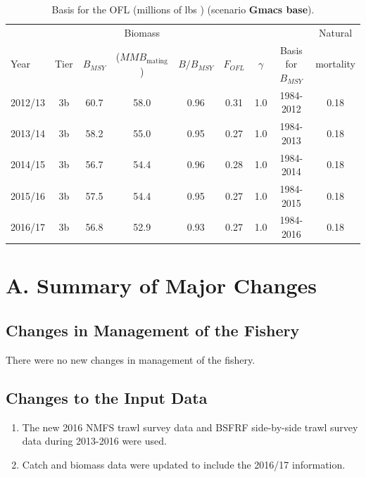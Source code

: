 \documentclass[]{article}
\providecommand{\tightlist}{%
  \setlength{\itemsep}{0pt}\setlength{\parskip}{0pt}}
\begin{document}
\begin{table}[ht]
\centering
\caption{Basis for the OFL (millions of lbs ) (scenario {\bf Gmacs base}).} 
\label{tab:ofl_basis_pounds}
\begin{tabular}{lcccccccc}
\hline
     &      &                  & Biomass                        &                    &                  &          &                            & Natural  \\ 
Year & Tier & $B_\mathit{MSY}$ & ($\mathit{MMB}_\text{mating}$) & $B/B_\mathit{MSY}$ & $F_\mathit{OFL}$ & $\gamma$ & Basis for $B_\mathit{MSY}$ & mortality \\ 
\hline
2012/13 & 3b & 60.7 & 58.0   & 0.96         & 0.31 & 1.0 & 1984-2012 &            0.18 \\
2013/14 & 3b & 58.2 & 55.0   & 0.95         & 0.27 & 1.0 & 1984-2013 &            0.18 \\
2014/15 & 3b & 56.7 & 54.4   & 0.96         & 0.28 & 1.0 & 1984-2014 &            0.18 \\
2015/16 & 3b & 57.5 & 54.4   & 0.95         & 0.27 & 1.0 & 1984-2015 &            0.18 \\
2016/17 & 3b & 56.8 & 52.9   & 0.93         & 0.27 & 1.0 & 1984-2016 &            0.18 \\
\hline
\end{tabular}
\end{table}

\section{A. Summary of Major Changes}\label{a.-summary-of-major-changes}

\subsection{Changes in Management of the
Fishery}\label{changes-in-management-of-the-fishery}

There were no new changes in management of the fishery.

\subsection{Changes to the Input Data}\label{changes-to-the-input-data}

\begin{enumerate}
\def\labelenumi{\alph{enumi}.}
\tightlist
\item
  The new 2016 NMFS trawl survey data and BSFRF side-by-side trawl
  survey data during 2013-2016 were used.\\
\item
  Catch and biomass data were updated to include the 2016/17
  information.
\end{enumerate}
\end{document}
